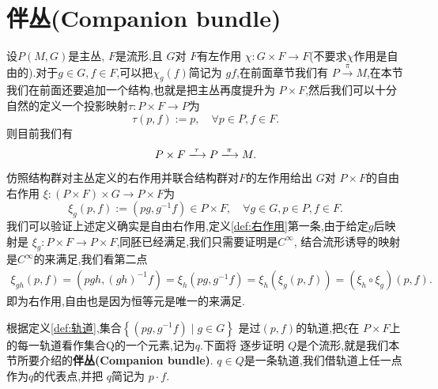 \documentclass[../main.tex]{subfiles}
\begin{document}
\chapter{伴丛(Companion bundle)}
设$P(M,G)$是主丛, $F$是流形,且 $G$对 $F$有左作用 $\chi: G \times F \to F$(不要求$\chi$作用是自由的).对于$g \in G, f\in F$,可以把$\chi_g(f)$简记为 $gf$,在前面章节我们有
$P \xrightarrow{\pi} M$,在本节我们在前面还要追加一个结构,也就是把主丛再度提升为 $P\times F$,然后我们可以十分自然的定义一个投影映射$\tau: P\times F \to P$为\[
\tau(p,f):= p, \quad \forall p \in P, f\in F 
.\] 则目前我们有\[
P\times F \xlongrightarrow{\tau} P \xlongrightarrow{\pi} M
.\] 
仿照结构群对主丛定义的右作用并联合结构群对$F$的左作用给出 $G$对 $P \times F$的自由右作用 $\xi:(P \times F) \times G \to  P \times F$为\[
\xi_g(p,f):= (pg, g^{-1}f) \in P\times F, \quad \forall g \in  G, p \in P, f \in F 
.\] 
我们可以验证上述定义确实是自由右作用,定义\ref{def:右作用}第一条,由于给定$g$后映射是 $\xi_g : P\times F \to  P\times F$,同胚已经满足,我们只需要证明是$C^\infty$,
结合流形诱导的映射是$C^\infty$的来满足,我们看第二点
\begin{align*}
  \xi_{gh}(p,f) = (pgh, (gh)^{-1}f) = \xi_h(pg,g^{-1}f) = \xi_h(\xi_g(p,f)) = (\xi_h \circ \xi_g)(p,f) 
.\end{align*}
即为右作用,自由也是因为恒等元是唯一的来满足.

根据定义\ref{def:轨道},集合$\left\{(pg, g^{-1}f) \mid g \in G  \right\} $ 是过$(p,f)$的轨道,把$\xi$在 $P\times F$上的每一轨道看作集合Q的一个元素,记为$q$.下面将
逐步证明 $Q$是个流形,就是我们本节所要介绍的\textbf{伴丛(Companion bundle)}. $q\in Q$是一条轨道,我们借轨道上任一点作为$q$的代表点,并把 $q$简记为 $p \cdot  f$.
\end{document}
